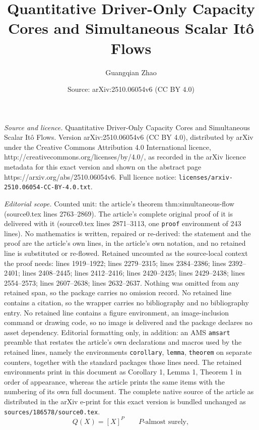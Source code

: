 \documentclass[10pt,a4paper]{amsart}
\title{Quantitative Driver-Only Capacity Cores and Simultaneous Scalar It\^o Flows}
\author{Guangqian Zhao}
\date{Source: arXiv:2510.06054v6 (CC BY 4.0)}
\begin{document}
\maketitle

\noindent\emph{Source and licence.} Quantitative Driver-Only Capacity Cores and Simultaneous Scalar It\^o Flows. Version arXiv:2510.06054v6 (CC BY 4.0), distributed by arXiv under the Creative Commons Attribution 4.0 International licence, http://creativecommons.org/licenses/by/4.0/, as recorded in the arXiv licence metadata for this exact version and shown on the abstract page https://arxiv.org/abs/2510.06054v6. Full licence notice: \texttt{licenses/arxiv-2510.06054-CC-BY-4.0.txt}.\par\smallskip

\noindent\textit{Editorial scope.} Counted unit: the article's theorem thm:simultaneous-flow (source0.tex lines 2763--2869). The article's complete original proof of it is delivered with it (source0.tex lines 2871--3113, one \texttt{proof} environment of 243 lines). No mathematics is written, repaired or re-derived: the statement and the proof are the article's own lines, in the article's own notation, and no retained line is substituted or re-flowed.  Retained uncounted as the source-local context the proof needs: lines 1919--1922; lines 2279--2315; lines 2384--2386; lines 2392--2401; lines 2408--2445; lines 2412--2416; lines 2420--2425; lines 2429--2438; lines 2554--2573; lines 2607--2638; lines 2632--2637.  Nothing was omitted from any retained span, so the package carries no omission record.  No retained line contains a citation, so the wrapper carries no bibliography and no bibliography entry.  No retained line contains a figure environment, an image-inclusion command or drawing code, so no image is delivered and the package declares no asset dependency.  Editorial formatting only, in addition: an AMS \texttt{amsart} preamble that restates the article's own declarations and macros used by the retained lines, namely the environments \texttt{corollary}, \texttt{lemma}, \texttt{theorem} on separate counters, together with the standard packages those lines need.  The retained environments print in this document as Corollary 1, Lemma 1, Theorem 1 in order of appearance, whereas the article prints the same items with the numbering of its own full document.  The complete native source of the article as distributed in the arXiv e-print for this exact version is bundled unchanged as \texttt{sources/186578/source0.tex}.
\begin{equation}\label{eq:intrinsic-qv-identification}
  Q(X)=[X]^P
  \qquad P\text{-almost surely},
\end{equation}
\end{document}
